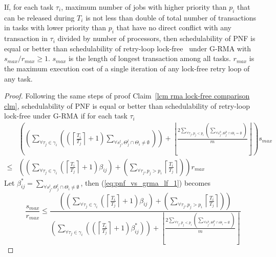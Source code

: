 %
\begin{clm}\label{clm:pnf_grma_lf_comp}
%
If, for each task $\tau_i$, maximum number of jobs with higher priority than $p_{i}$ that
can be released during $T_{i}$ is not less than double of total number of transactions in tasks with lower priority than $p_{i}$ that have no direct conflict with any transaction in $\tau_{i}$ divided by number of processors, then schedulability of PNF is equal or better than schedulability of retry-loop lock-free~\cite{key-5} under G-RMA with $s_{max}/r_{max} \ge 1$. $s_{max}$ is the length of longest transaction among all tasks. $r_{max}$ is the maximum execution cost of a single iteration of any lock-free retry loop of any task.
%
\end{clm}
%
\begin{proof}\normalfont
%
Following the same steps of proof Claim~\ref{lcm rma lock-free comparison clm}, schedulability of PNF is equal or better than schedulability of retry-loop lock-free under G-RMA if for each task $\tau_i$
%
\begin{eqnarray}
 & \left(\left(\sum_{\forall\tau_{j}\in\gamma_{i}}\left(\left(\left\lceil \frac{T_{i}}{T_{j}}\right\rceil +1\right)\sum_{\forall s_{j}^{l},\Theta_{j}^{l}\cap\Theta_{i}\neq\emptyset}\right)\right)+\left\lfloor \frac{2\sum_{\forall\tau_{j},p_{j}<p_{i}}\left(\sum_{\forall s_{j}^{h},\Theta_{j}^{h}\cap\Theta_{i}=\emptyset}\right)}{m}\right\rfloor \right)s_{max}\nonumber \\
\le & \left(\left(\sum_{\forall\tau_{j}\in\gamma_{i}}\left(\left\lceil \frac{T_{i}}{T_{j}}\right\rceil +1\right)\beta_{ij}\right)+\left(\sum_{\forall\tau_{j},p_{j}>p_{i}}\left\lceil \frac{T_{i}}{T_{j}}\right\rceil \right)\right)r_{max}\label{eq:pnf_vs_grma_lf_1}
\end{eqnarray}
%
Let $\beta_{ij}^{*}=\sum_{\forall s_{j}^{l},\Theta_{j}^{l}\cap\Theta_{i}\neq\emptyset}$,
then (\ref{eq:pnf_vs_grma_lf_1}) becomes 
%
\begin{equation}
\frac{s_{max}}{r_{max}}\le\frac{\left(\left(\sum_{\forall\tau_{j}\in\gamma_{i}}\left(\left\lceil \frac{T_{i}}{T_{j}}\right\rceil +1\right)\beta_{ij}\right)+\left(\sum_{\forall\tau_{j},p_{j}>p_{i}}\left\lceil \frac{T_{i}}{T_{j}}\right\rceil \right)\right)}{\left(\sum_{\forall\tau_{j}\in\gamma_{i}}\left(\left(\left\lceil \frac{T_{i}}{T_{j}}\right\rceil +1\right)\beta_{ij}^{*}\right)\right)+\left\lfloor \frac{2\sum_{\forall\tau_{j},p_{j}<p_{i}}\left(\sum_{\forall s_{j}^{h},\Theta_{j}^{h}\cap\Theta_{i}=\emptyset}\right)}{m}\right\rfloor }\label{eq:pnf_vs_grma_lf_2}
\end{equation}

\end{proof}
